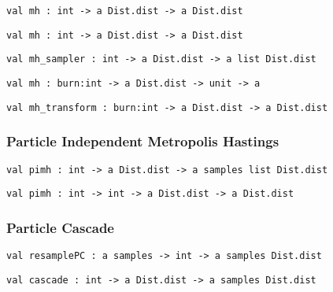 \protect\hyperlink{val-mhux27}{}\texttt{val\ mh\textquotesingle{}\ :\ int\ -\textgreater{}\ \textquotesingle{}a\ Dist.dist\ -\textgreater{}\ \textquotesingle{}a\ Dist.dist}

\protect\hyperlink{val-mhux27ux27}{}\texttt{val\ mh\textquotesingle{}\textquotesingle{}\ :\ int\ -\textgreater{}\ \textquotesingle{}a\ Dist.dist\ -\textgreater{}\ \textquotesingle{}a\ Dist.dist}

\protect\hyperlink{val-mhux5fsampler}{}\texttt{val\ mh\_sampler\ :\ int\ -\textgreater{}\ \textquotesingle{}a\ Dist.dist\ -\textgreater{}\ \textquotesingle{}a\ list\ Dist.dist}

\protect\hyperlink{val-mh}{}\texttt{val\ mh\ :\ burn:int\ -\textgreater{}\ \textquotesingle{}a\ Dist.dist\ -\textgreater{}\ unit\ -\textgreater{}\ \textquotesingle{}a}

\protect\hyperlink{val-mhux5ftransform}{}\texttt{val\ mh\_transform\ :\ burn:int\ -\textgreater{}\ \textquotesingle{}a\ Dist.dist\ -\textgreater{}\ \textquotesingle{}a\ Dist.dist}

\hypertarget{infux5fpmcmc}{\subsubsection{\texorpdfstring{\protect\hyperlink{infux5fpmcmc}{}Particle
Independent Metropolis
Hastings}{Particle Independent Metropolis Hastings}}\label{infux5fpmcmc}}

\protect\hyperlink{val-pimh}{}\texttt{val\ pimh\ :\ int\ -\textgreater{}\ \textquotesingle{}a\ Dist.dist\ -\textgreater{}\ \textquotesingle{}a\ samples\ list\ Dist.dist}

\protect\hyperlink{val-pimhux27}{}\texttt{val\ pimh\textquotesingle{}\ :\ int\ -\textgreater{}\ int\ -\textgreater{}\ \textquotesingle{}a\ Dist.dist\ -\textgreater{}\ \textquotesingle{}a\ Dist.dist}

\hypertarget{infux5fpc}{\subsubsection{\texorpdfstring{\protect\hyperlink{infux5fpc}{}Particle
Cascade}{Particle Cascade}}\label{infux5fpc}}

\protect\hyperlink{val-resamplePC}{}\texttt{val\ resamplePC\ :\ \textquotesingle{}a\ samples\ -\textgreater{}\ int\ -\textgreater{}\ \textquotesingle{}a\ samples\ Dist.dist}

\protect\hyperlink{val-cascade}{}\texttt{val\ cascade\ :\ int\ -\textgreater{}\ \textquotesingle{}a\ Dist.dist\ -\textgreater{}\ \textquotesingle{}a\ samples\ Dist.dist}

